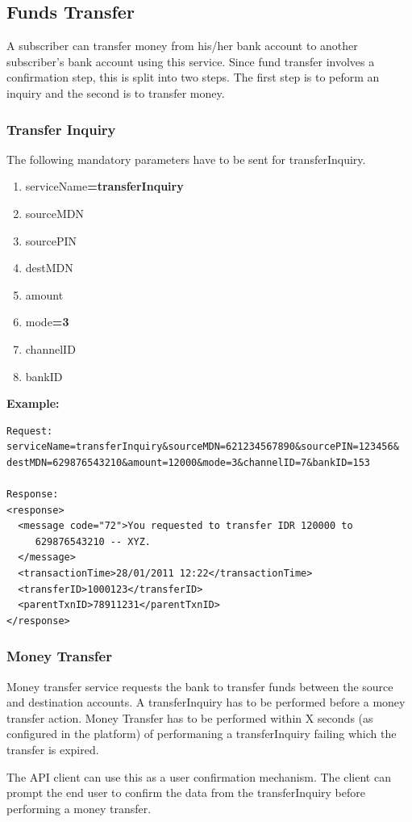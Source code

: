\documentclass[11pt,titlepage]{article}
\begin{document}
\subsection{Funds Transfer}
A subscriber can transfer money from his/her bank account to another subscriber's bank account using this service. Since fund transfer involves a confirmation step, this is split into two steps. The first step is to peform an inquiry and the second is to transfer money. 
\subsubsection{Transfer Inquiry}
The following mandatory parameters have to be sent for transferInquiry.
\begin{enumerate}
\item serviceName\textbf{=transferInquiry}
\item sourceMDN
\item sourcePIN
\item destMDN
\item amount
\item mode\textbf{=3}
\item channelID
\item bankID
\end{enumerate}

\textbf{Example:}
\begin{verbatim}
Request:
serviceName=transferInquiry&sourceMDN=621234567890&sourcePIN=123456&
destMDN=629876543210&amount=12000&mode=3&channelID=7&bankID=153

Response:
<response>
  <message code="72">You requested to transfer IDR 120000 to 
     629876543210 -- XYZ. 
  </message>
  <transactionTime>28/01/2011 12:22</transactionTime>
  <transferID>1000123</transferID>
  <parentTxnID>78911231</parentTxnID>
</response>
\end{verbatim}

\subsubsection{Money Transfer}
Money transfer service requests the bank to transfer funds between the source and destination accounts. A transferInquiry has to be performed before a money transfer action. Money Transfer has to be performed within X seconds (as configured in the platform) of performaning a transferInquiry failing which the  transfer is expired.

The API client can use this as a user confirmation mechanism. The client can prompt the end user to confirm the data from the transferInquiry before performing a money transfer. 
\end{document}
